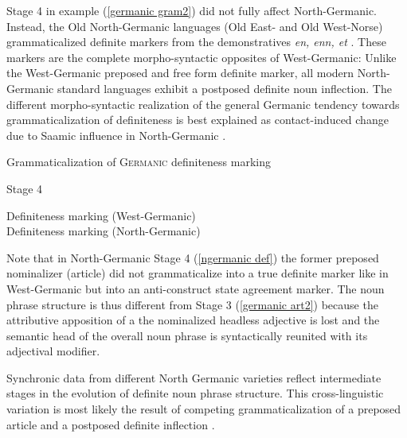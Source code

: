 {Stage 4 in example (\ref{germanic gram2}) did not fully affect North-Germanic. Instead, the Old North-Germanic languages (Old East- and Old West-Norse) grammaticalized definite markers from the demonstratives \textit{en, enn, et} \citep[15]{heinrichs1954}. These markers are the complete morpho-syntactic opposites of West-Germanic: Unlike the West-Germanic preposed and free form definite marker, all modern North-Germanic standard languages exhibit a postposed definite noun inflection. The different morpho-syntactic realization of the general Germanic tendency towards grammaticalization of definiteness is best explained as contact-induced change due to Saamic influence in North-Germanic \citep{kusmenko2008}.
\begin{exe}
\ex Grammaticalization of \textsc{Germanic} definiteness marking \label{germanic gram3}
\begin{xlist}
\ex 	Stage 4
\begin{xlist}
\ex	Definiteness marking (West-Germanic)\\
\ex	Definiteness marking (North-Germanic)\\
\end{xlist}
\end{xlist}
\end{exe}
Note that in North-Germanic Stage 4 (\ref{ngermanic def}) the former preposed nominalizer (article) did not grammaticalize into a true definite marker like in West-Germanic but into an anti-construct state agreement marker. The noun phrase structure is thus different from Stage 3 (\ref{germanic art2}) because the attributive apposition of a the nominalized headless adjective is lost and the semantic head of the overall noun phrase is syntactically reunited with its adjectival modifier.

Synchronic data from different North Germanic varieties reflect intermediate stages in the evolution of definite noun phrase structure. This cross-linguistic variation is most likely the result of competing grammaticalization of a preposed article and a postposed definite inflection \citep{dahl2003}. 

}
